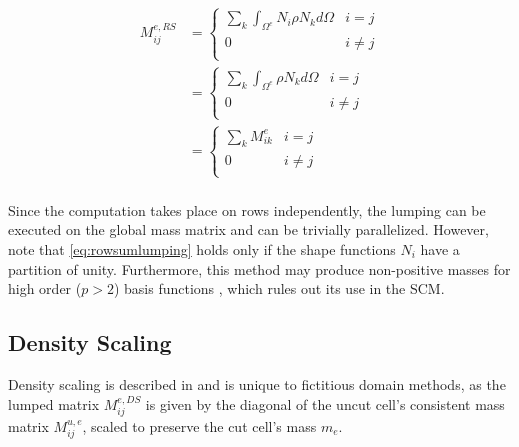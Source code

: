 \begin{equation} \label{eq:rowsumlumping}
	\begin{array}{ll}
	M_{ij}^{e,RS}
	
	&= \left\{ \begin{array}{ll}
			\sum_k \int_{\Omega^e} N_i \rho N_k d\Omega & i=j \\
			0 & i \neq j \\
		\end{array} \right. \\
		
	&= \left\{ \begin{array}{ll}
			\sum_k \int_{\Omega^e} \rho N_k d\Omega & i=j \\
			0 & i \neq j \\
		\end{array} \right. \\
		
	&= \left\{ \begin{array}{ll}
			\sum_k M_{ik}^e & i=j \\
			0 & i \neq j \\
		\end{array} \right. \\
		
	\end{array}
\end{equation}

Since the computation takes place on rows independently, the lumping can be executed
on the global mass matrix and can be trivially parallelized. However, note that
\ref{eq:rowsumlumping} holds only if the shape functions $N_i$ have a partition
of unity. Furthermore, this method may produce non-positive masses for high order ($p>2$)
basis functions \cite{Duczek2014}, which rules out its use in the SCM.

%
\subsection{Density Scaling}
\label{section:?lumping}
%

Density scaling is described in \cite{Joulaian2014} and is unique to fictitious
domain methods, as the lumped matrix $M_{ij}^{e,DS}$ is given by the diagonal of the uncut cell's
consistent mass matrix $M_{ij}^{u,e}$, scaled to preserve the cut cell's mass $m_e$.

